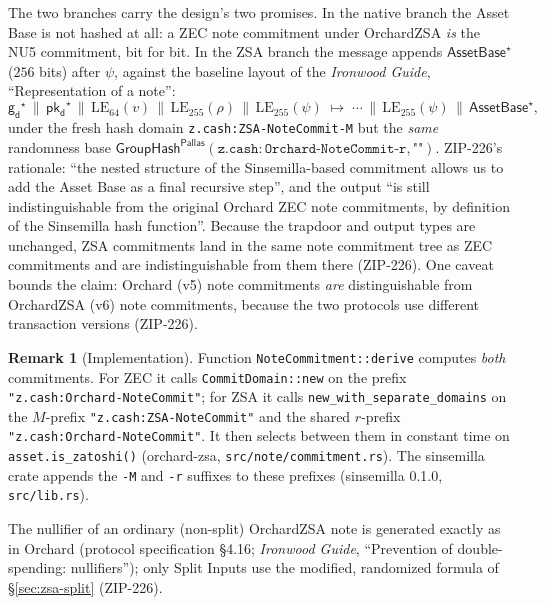 \documentclass[11pt,a4paper]{article}
\theoremstyle{definition}
\newtheorem{remark}[theorem]{Remark}
\newcommand{\Pallas}{\ensuremath{\mathsf{Pallas}}}
\newcommand{\GroupHash}{\ensuremath{\mathsf{GroupHash}}}
\newcommand{\pkd}{\ensuremath{\mathsf{pk_d}}}
\newcommand{\gd}{\ensuremath{\mathsf{g_d}}}
\begin{document}
The two branches carry the design's two promises. In the native branch the
Asset Base is not hashed at all: a ZEC note commitment under OrchardZSA
\emph{is} the NU5 commitment, bit for bit. In the ZSA branch the message
appends $\mathsf{AssetBase}^\star$ ($256$ bits) after $\psi$, against the
baseline layout of the \emph{Ironwood Guide}, ``Representation of a note'':
\[
\gd^\star \,\|\, \pkd^\star \,\|\, \mathrm{LE}_{64}(v) \,\|\,
\mathrm{LE}_{255}(\rho) \,\|\, \mathrm{LE}_{255}(\psi)
\;\longmapsto\;
\cdots \,\|\, \mathrm{LE}_{255}(\psi) \,\|\, \mathsf{AssetBase}^\star,
\]
under the fresh hash domain
\texttt{z.cash:ZSA-NoteCommit-M} but the \emph{same} randomness base
$\GroupHash^{\Pallas}(\mathtt{z.cash:Orchard\text{-}NoteCommit\text{-}r},
\texttt{""})$. ZIP-226's rationale: ``the nested structure of the
Sinsemilla-based commitment allows us to add the Asset Base as a final
recursive step'', and the output ``is still indistinguishable from the
original Orchard ZEC note commitments, by definition of the Sinsemilla hash
function''. Because the trapdoor and output types are unchanged, ZSA
commitments land in the same note commitment tree as ZEC commitments and are
indistinguishable from them there (ZIP-226). One caveat bounds the claim:
Orchard (v5) note commitments \emph{are} distinguishable from OrchardZSA
(v6) note commitments, because the two protocols use different transaction
versions (ZIP-226).

\begin{remark}[Implementation]\label{rem:zsa-notecommit-impl}
Function \texttt{NoteCommitment::derive} computes \emph{both} commitments.
For ZEC it calls \texttt{CommitDomain::new} on the prefix
\texttt{"z.cash:Orchard-NoteCommit"}; for ZSA it calls
\texttt{new\_with\_separate\_domains} on the $M$-prefix
\texttt{"z.cash:ZSA-NoteCommit"} and the shared $r$-prefix
\texttt{"z.cash:Orchard-NoteCommit"}. It then selects between
them in constant time on \texttt{asset.is\_zatoshi()} (\textsf{orchard-zsa},
\texttt{src/note/commitment.rs}). The \textsf{sinsemilla} crate appends the
\texttt{-M} and \texttt{-r} suffixes to these prefixes (\textsf{sinsemilla}
0.1.0, \texttt{src/lib.rs}).
\end{remark}

The nullifier of an ordinary (non-split) OrchardZSA note is generated
exactly as in Orchard (protocol specification \S4.16; \emph{Ironwood Guide},
``Prevention of double-spending: nullifiers''); only Split Inputs use the
modified, randomized formula of \S\ref{sec:zsa-split} (ZIP-226).
\end{document}
